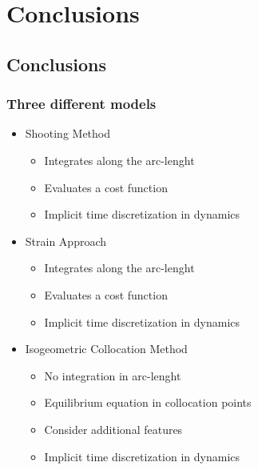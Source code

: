 \documentclass[compress]{thesisbeamer}
\begin{document}
  	\section{Conclusions}
      	\subsection{Conclusions}
        \begin{frame}
        	\frametitle{Three different models}
        	\begin{itemize}
        		\item Shooting Method
        		\begin{itemize}
        			\item Integrates along the arc-lenght
        			\item Evaluates a cost function
        			\item Implicit time discretization in dynamics
        		\end{itemize}
        		\item Strain Approach
        		\begin{itemize}
        			\item Integrates along the arc-lenght
        			\item Evaluates a cost function
        			\item Implicit time discretization in dynamics
        		\end{itemize}
        		\item Isogeometric Collocation Method
        		\begin{itemize}
        			\item No integration in arc-lenght
        			\item Equilibrium equation in collocation points
        			\item Consider additional features 
        			\item Implicit time discretization in dynamics
        		\end{itemize}
        	\end{itemize}
        \end{frame}
        	
\end{document}
